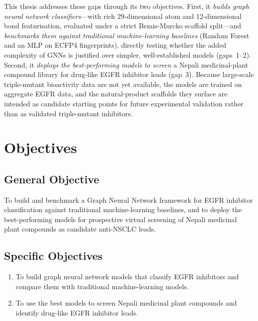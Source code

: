 \noindent This thesis addresses these gaps through its two objectives. First, it
\emph{builds graph neural network classifiers}---with rich 29-dimensional atom and
12-dimensional bond featurisation, evaluated under a strict Bemis-Murcko scaffold
split---and \emph{benchmarks them against traditional machine-learning baselines}
(Random Forest and an MLP on ECFP4 fingerprints), directly testing whether the added
complexity of GNNs is justified over simpler, well-established models (gaps~1--2).
Second, it \emph{deploys the best-performing models to screen} a Nepali medicinal-plant
compound library for drug-like EGFR inhibitor leads (gap~3). Because large-scale
triple-mutant bioactivity data are not yet available, the models are trained on
aggregate EGFR data, and the natural-product scaffolds they surface are intended as
candidate starting points for future experimental validation rather than as validated
triple-mutant inhibitors.

\section{Objectives}

\subsection{General Objective}

To build and benchmark a Graph Neural Network framework for EGFR inhibitor
classification against traditional machine-learning baselines, and to deploy the
best-performing models for prospective virtual screening of Nepali medicinal plant
compounds as candidate anti-NSCLC leads.

\subsection{Specific Objectives}

\begin{enumerate}
    \item To build graph neural network models that classify EGFR inhibitors and
          compare them with traditional machine-learning models.

    \item To use the best models to screen Nepali medicinal plant compounds and
          identify drug-like EGFR inhibitor leads.
\end{enumerate}

